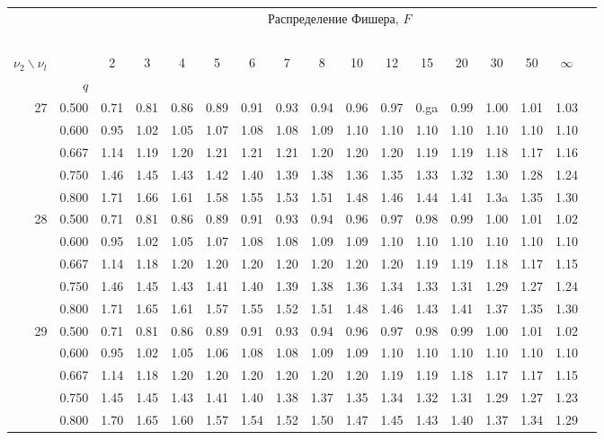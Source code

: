 {\begin{center}
\begin{tabular}{rrr@{\,}r@{\,}r@{\,}r@{\,}r@{\,}r@{\,}r@{\,}r
                   @{\,}r@{\,}r@{\,}r@{\,}r@{\,}r@{\,}r@{\,}r}
&&\multicolumn{14}{c}{Распределение Фишера, $F$}\\
\ \\
$\nu_2\backslash\nu_l$ & & 
\multicolumn{1}{c}{2} &\multicolumn{1}{c}{3} &
\multicolumn{1}{c}{4} &\multicolumn{1}{c}{5} &
\multicolumn{1}{c}{6} &\multicolumn{1}{c}{7} &
\multicolumn{1}{c}{8} &\multicolumn{1}{c}{10}&
\multicolumn{1}{c}{12}&\multicolumn{1}{c}{15}&
\multicolumn{1}{c}{20}&\multicolumn{1}{c}{30}&
\multicolumn{1}{c}{50}&\multicolumn{1}{c}{$\infty$}\\
& $q$ \\
27&0.500&0.71&0.81&0.86&0.89&0.91&0.93&0.94&0.96&0.97&0.ga&0.99&1.00&1.01&1.03\\
  &0.600&0.95&1.02&1.05&1.07&1.08&1.08&1.09&1.10&1.10&1.10&1.10&1.10&1.10&1.10\\
  &0.667&1.14&1.19&1.20&1.21&1.21&1.21&1.20&1.20&1.20&1.19&1.19&1.18&1.17&1.16\\
  &0.750&1.46&1.45&1.43&1.42&1.40&1.39&1.38&1.36&1.35&1.33&1.32&1.30&1.28&1.24\\
  &0.800&1.71&1.66&1.61&1.58&1.55&1.53&1.51&1.48&1.46&1.44&1.41&1.3a&1.35&1.30\\
28&0.500&0.71&0.81&0.86&0.89&0.91&0.93&0.94&0.96&0.97&0.98&0.99&1.00&1.01&1.02\\
  &0.600&0.95&1.02&1.05&1.07&1.08&1.08&1.09&1.09&1.10&1.10&1.10&1.10&1.10&1.10\\
  &0.667&1.14&1.18&1.20&1.20&1.20&1.20&1.20&1.20&1.20&1.19&1.19&1.18&1.17&1.15\\
  &0.750&1.46&1.45&1.43&1.41&1.40&1.39&1.38&1.36&1.34&1.33&1.31&1.29&1.27&1.24\\
  &0.800&1.71&1.65&1.61&1.57&1.55&1.52&1.51&1.48&1.46&1.43&1.41&1.37&1.35&1.30\\
29&0.500&0.71&0.81&0.86&0.89&0.91&0.93&0.94&0.96&0.97&0.98&0.99&1.00&1.01&1.02\\
  &0.600&0.95&1.02&1.05&1.06&1.08&1.08&1.09&1.09&1.10&1.10&1.10&1.10&1.10&1.10\\
  &0.667&1.14&1.18&1.20&1.20&1.20&1.20&1.20&1.20&1.19&1.19&1.18&1.17&1.17&1.15\\
  &0.750&1.45&1.45&1.43&1.41&1.40&1.38&1.37&1.35&1.34&1.32&1.31&1.29&1.27&1.23\\
  &0.800&1.70&1.65&1.60&1.57&1.54&1.52&1.50&1.47&1.45&1.43&1.40&1.37&1.34&1.29\\

\end{tabular}
\end{center}}
